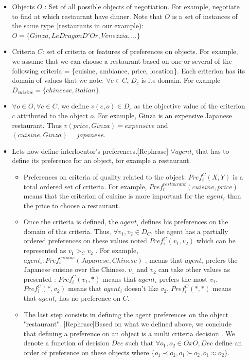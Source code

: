 \documentclass{llncs}
\begin{document}
 \begin{itemize}
 \item Objects $O$ : Set of all possible objects of negotiation. For example, negotiate to find at which restaurant have dinner. Note that $O$ is a set of instances of the same type (restaurants in our example):
  \\ $O=\{Ginza, LeDragonD'Or,  Venezzia, \ldots\}$
 \item Criteria $C$: set of criteria or features of preferences on objects. For example, we assume that we can choose a restaurant based on one or several of the following criteria = \{cuisine, ambiance, price, location\}. Each criterion has its domain of values that we note: $\forall c \in C$, $D_{c}$ is its domain. For example $D_{cuisine} = \{chineese, italian\}$.

 \item $\forall o \in O, \forall c \in C$, we define $v(c,o) \in D_{c}$ as the objective value of the criterion $c$ attributed to the object $o$. For example, Ginza is an expensive Japanese restaurant. Thus $v(price, Ginza) = expensive$ and $(cuisine, Ginza) = japanese$. 
 
 \item Lets now define interlocutor's preferences.[Rephrase] $\forall agent_{i}$ that has to define its preference for an object, for example a restaurant.
 \begin{itemize}
 \item Preferences on criteria of quality related to the object: $Pref_{i}^C (X,Y) $ is a total ordered set of criteria. For example, $ Pref_{i}^{restaurant} (cuisine,price)$ means that the criterion of cuisine is more important for the $agent_{i}$  than the price to choose a restaurant. 
 \item Once the criteria is defined, the $agent_{i}$ defines his preferences on the domain of this criteria. Thus, $\forall v_{1} , v_{2} \in D_{C}$, the agent has a  partially ordered preferences on these values noted $Pref_{i}^C (v_{1}, v_{2})$  which can be represented as $v_{1}>_{C} v_{2}$ . For example, $agent_{i}:  Pref_{i}^{cuisine} (Japanese , Chinese)$ , means that  $agent_{i}$ prefers the Japanese cuisine over the Chinese. $v_{1} $ and $ v_{2}$ can take other values as presented : 
 \subitem $Pref_{i}^C (v_{1}, *)$ means that $agent_{i}$ prefers the most $v_{1}$. 
 \subitem $Pref_{i}^C (*,v_{2})$ means that $agent_{i}$ doesn't like  $v_{2}$. 
 \subitem $Pref_{i}^C (*,*)$ means that $agent_{i}$ has no preference on $C$. 
 \item The last step consists in defining the agent preferences on the object "restaurant". [Rephrase]Based on what we defined above, we conclude that defining a preference on an object is a multi criteria decision \cite{figueira2005multiple}. We denote a function of decision  $Dec$ such that $\forall o_{1}, o_{2} \in O x O, Dec$ define an order of preference on these objects where  $\{o_{1}\prec o_{2}, o_{1} \succ o_{2}, o_{1} \approx o_{2}\}$.
 \end{itemize} 
 \end{itemize}
\end{document}
